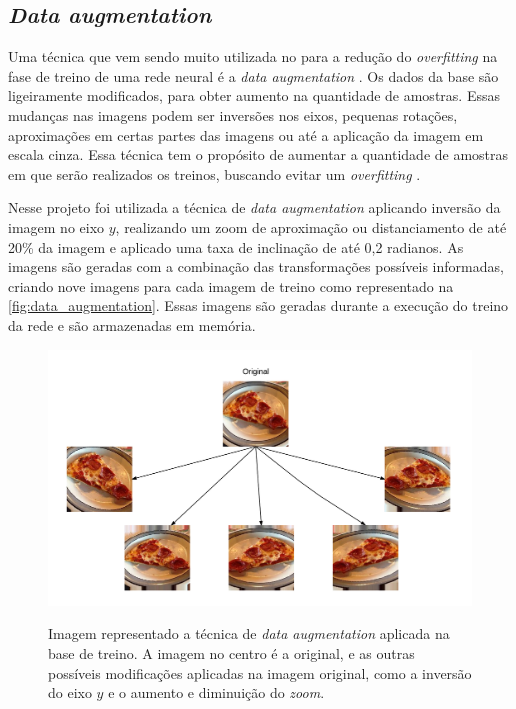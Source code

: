 \subsection{\textit{Data augmentation}}
Uma técnica que vem sendo muito utilizada no para a redução do \textit{overfitting} na fase de treino de uma rede neural é a \textit{data augmentation} \cite{cui2015data}. 
Os dados da base são ligeiramente modificados, para obter aumento na quantidade de amostras.
Essas mudanças nas imagens podem ser inversões nos eixos, pequenas rotações, aproximações em certas partes das imagens ou até a aplicação da imagem em escala cinza.
Essa técnica tem o propósito de aumentar a quantidade de amostras em que serão realizados os treinos, buscando evitar um \textit{overfitting} \cite{imaginetArticle}.
\par Nesse projeto foi utilizada a técnica de \textit{data augmentation} aplicando inversão da imagem no eixo $y$, realizando um zoom de aproximação ou distanciamento de até 20\% da imagem e aplicado uma taxa de inclinação de até 0,2 radianos. As imagens são geradas com a combinação das transformações possíveis informadas, criando nove imagens para cada imagem de treino como representado na \autoref{fig:data_augmentation}. Essas imagens são geradas durante a execução do treino da rede e são armazenadas em memória.

\begin{figure}[H]
  \centering
  \caption{Imagem representado a técnica de \textit{data augmentation} aplicada na base de treino. A imagem no centro é a original, e as outras possíveis modificações aplicadas na imagem original, como a inversão do eixo $y$ e o aumento e diminuição do \textit{zoom}.}
  \includegraphics[width=400pt]{dados/figuras/data_augmentation}
  \label{fig:data_augmentation}
\end{figure}

